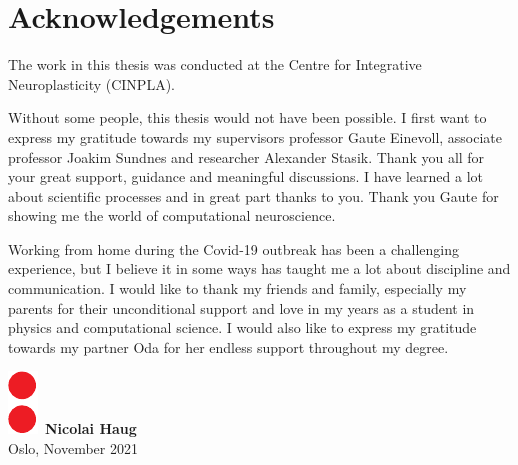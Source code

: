 \chapter*{Acknowledgements}
The work in this thesis was conducted at the Centre for Integrative Neuroplasticity (CINPLA).

Without some people, this thesis would not have been possible. I first want to express my gratitude towards my supervisors professor Gaute Einevoll, associate professor Joakim Sundnes and researcher Alexander Stasik. Thank you all for your great support, guidance and meaningful discussions. I have learned a lot about scientific processes and in great part thanks to you. Thank you Gaute for showing me the world of computational neuroscience.

Working from home during the Covid-19 outbreak has been a challenging experience, but I believe it in some ways has taught me a lot about discipline and communication. I would like to thank my friends and family, especially my parents for their unconditional support and love in my years as a student in physics and computational science. I would also like to express my gratitude towards my partner Oda for her endless support throughout my degree. 
\\ [8 pt]

\begin{flushright}
\includegraphics[height = 1.5ex]{latex/latex-report/Images/Logo/UiO/uio-colon.pdf}\, \textbf{Nicolai Haug}
\\
Oslo, November 2021
\end{flushright}
